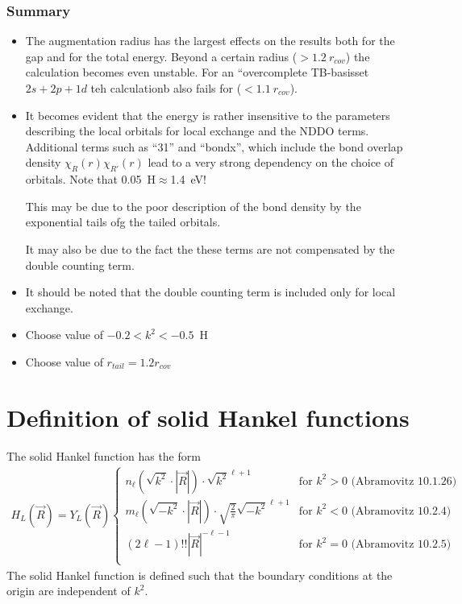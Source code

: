 \documentclass[11pt,a4paper]{report}
\begin{document}
\subsection{Summary}
\begin{itemize}
\item The augmentation radius has the largest effects on the results
  both for the gap and for the total energy. Beyond a certain radius
  ($>1.2~r_{cov}$) the calculation becomes even unstable. For an
  ``overcomplete TB-basisset $2s+2p+1d$ teh calculationb also fails for
  ($<1.1~r_{cov}$).
%
\item It becomes evident that the energy is rather insensitive to the
  parameters describing the local orbitals for local exchange and the
  NDDO terms. Additional terms such as ``31'' and ``bondx'', which
  include the bond overlap density $\chi_R(r)\chi_{R'}(r)$ lead to a
  very strong dependency on the choice of orbitals. Note that
  0.05~H$\approx$1.4~eV!

  This may be due to the poor description of the bond density by the
  exponential tails ofg the tailed orbitals.

  It may also be due to the fact the these terms are not compensated
  by the double counting term.
% 
\item It should be noted that the double counting term is included
  only for local exchange.
%
\item Choose value of $-0.2<k^2<-0.5$~H 
%
\item Choose value of $r_{tail}=1.2 r_{cov}$
\end{itemize}





\appendix
\chapter{Definition of solid Hankel functions}
\label{app:solidhankel}
The solid Hankel function has the form
\begin{eqnarray}
H_L(\vec{R})=Y_L(\vec{R})
\begin{cases}
n_\ell(\sqrt{k^2}\cdot|\vec{R}|) \cdot \sqrt{k^2}^{\ell+1}
&\text{for $k^2>0$  (Abramovitz 10.1.26)}\\
m_\ell(\sqrt{-k^2}\cdot|\vec{R}|) \cdot \sqrt{\frac{2}{\pi}} \sqrt{-k^2}^{\ell+1}
&\text{for $k^2<0$  (Abramovitz 10.2.4)}\\
(2\ell-1)!! |\vec{R}|^{-\ell-1} 
&\text{for $k^2=0$  (Abramovitz 10.2.5)}\\
\end{cases}
\end{eqnarray}
The solid Hankel function is defined such that the boundary conditions
at the origin are independent of $k^2$.
\end{document}
